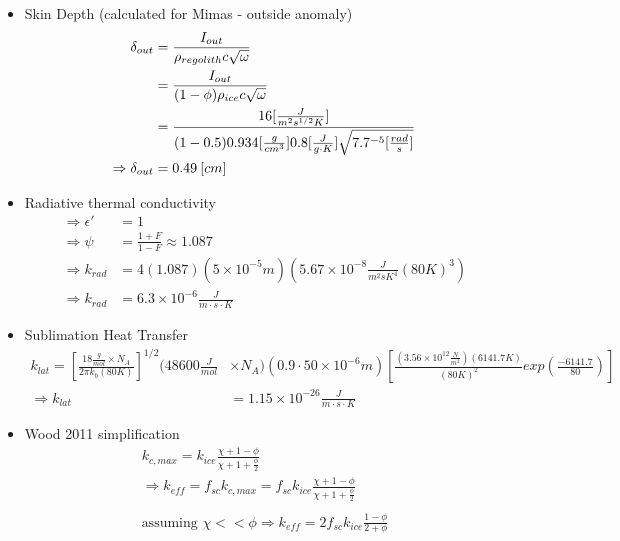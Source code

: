 \documentclass[11pt]{article} %
\begin{document}
\begin{itemize} 
\item Skin Depth (calculated for Mimas - outside anomaly)
\begin{equation}
\begin{split}
\delta_{out} &= \frac{I_{out}}{\rho_{regolith} c \sqrt{\omega}}  \\
&= \frac{I_{out}}{(1-\phi)\rho_ {ice} c \sqrt{\omega}} \\
&= \frac{16[\frac{J}{m^{2} s^{1/2} K}]}{(1-0.5)0.934[\frac{g}{cm^{3}}]0.8[\frac{J}{g \cdot K}]\sqrt{7.7\time10^{-5}[\frac{rad}{s}]}} \\
\Rightarrow \delta_{out}&= 0.49\: [cm]
\end{split}
\end{equation}

\item Radiative thermal conductivity
	\begin{equation}
	\begin{split}
	\Rightarrow \epsilon' &= 1 \\
	\Rightarrow \psi &= \frac{1+F}{1-F} \approx 1.087 \\
	\Rightarrow k_{rad} &= 4 (1.087)(5\times10^{-5} m)(5.67\times10^{-8} \frac{J}{m^{2} s K^{4}}(80 K)^{3}) \\
	\Rightarrow k_{rad} &= 6.3\times10^{-6} \frac{J}{m \cdot s \cdot K}
	\end{split}
	\end{equation}

\item Sublimation Heat Transfer
	\begin{equation}
	\begin{split}
	k_{lat} = [ \frac{18 \frac{g}{mol} \times N_{A}}{2 \pi k_{b} (80K)} ]^{1/2} (48600 \frac{J}{mol} & \times N_{A})(0.9 \cdot 50\times10^{-6} m) [ \frac{(3.56\times 10^{12} \frac{N}{m^{2}})(6141.7 K)}{(80 K)^{2}} exp( \frac{-6141.7}{80} ) ] \\
	\Rightarrow k_{lat} &= 1.15\times10^{-26}\frac{J}{m \cdot s \cdot K}
	\end{split}
	\end{equation}

\item Wood 2011 simplification
	\begin{equation}
	\begin{gathered}
	k_{c,max} = k_{ice} \frac{\chi + 1 - \phi}{\chi + 1 + \frac{\phi}{2}} \\
	\Rightarrow k_{eff} = f_{sc} k_{c,max} = f_{sc} k_{ice} \frac{\chi + 1 - \phi}{\chi + 1 + \frac{\phi}{2}} \\
	\\
	\text{assuming   } \chi << \phi  \Rightarrow k_{eff}=2 f_{sc} k_{ice} \frac{1-\phi}{2+\phi}
	\end{gathered}
	\end{equation}


\end{itemize}
\end{document}
